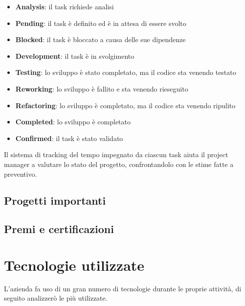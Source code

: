    \begin{itemize}
      \item{\textbf{Analysis}: il task richiede analisi}
      \item{\textbf{Pending}: il task è definito ed è in attesa di essere svolto}
      \item{\textbf{Blocked}: il task è bloccato a causa delle sue dipendenze}
      \item{\textbf{Development}: il task è in svolgimento}
      \item{\textbf{Testing}: lo sviluppo è stato completato, ma il codice sta venendo testato}
      \item{\textbf{Reworking}: lo sviluppo è fallito e sta venendo rieseguito}
      \item{\textbf{Refactoring}: lo sviluppo è completato, ma il codice sta venendo ripulito }
      \item{\textbf{Completed}: lo sviluppo è completato}
      \item{\textbf{Confirmed}: il task è stato validato}
   \end{itemize}
   Il sistema di tracking del tempo impegnato da ciascun task aiuta il project manager a valutare lo stato del progetto, confrontandolo con le stime fatte a preventivo.

   \subsection{Progetti importanti}

   \subsection{Premi e certificazioni}

\section{Tecnologie utilizzate}
L'azienda fa uso di un gran numero di tecnologie durante le proprie attività, di seguito analizzerò le più utilizzate.

